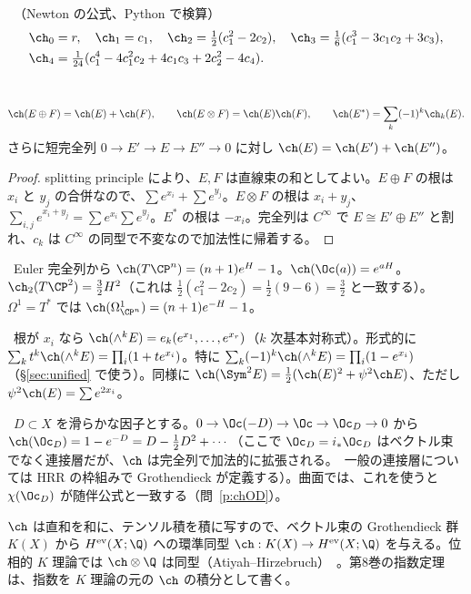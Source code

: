 \begin{thm}[低次の表]\label{thm:chlow}\tP\ （Newton の公式、Python で検算）
\begin{align*}
\ch_0&=r,\quad \ch_1=c_1,\quad \ch_2=\tfrac12(c_1^2-2c_2),\quad \ch_3=\tfrac16(c_1^3-3c_1c_2+3c_3),\\
\ch_4&=\tfrac1{24}(c_1^4-4c_1^2c_2+4c_1c_3+2c_2^2-4c_4).
\end{align*}
\end{thm}
\begin{thm}\label{thm:chmult}\tP\
\[
\ch(E\oplus F)=\ch(E)+\ch(F),\qquad \ch(E\otimes F)=\ch(E)\ch(F),\qquad \ch(E^*)=\sum_k(-1)^k\ch_k(E).
\]
さらに短完全列 $0\to E'\to E\to E''\to0$ に対し $\ch(E)=\ch(E')+\ch(E'')$。
\end{thm}
\begin{proof}
splitting principle により、$E,F$ は直線束の和としてよい。$E\oplus F$ の根は $x_i$ と $y_j$ の合併なので、$\sum e^{x_i}+\sum e^{y_j}$。$E\otimes F$ の根は $x_i+y_j$、$\sum_{i,j}e^{x_i+y_j}=\sum e^{x_i}\sum e^{y_j}$。$E^*$ の根は $-x_i$。完全列は $C^\infty$ で $E\cong E'\oplus E''$ と割れ、$c_k$ は $C^\infty$ の同型で不変なので加法性に帰着する。
\end{proof}
\begin{ex}[$\CP^n$ 上の計算]\label{ex:chPn}\tP\
Euler 完全列から $\ch(T\CP^n)=(n+1)e^H-1$。$\ch(\Oc(a))=e^{aH}$。$\ch_2(T\CP^2)=\frac32H^2$（これは $\frac12(c_1^2-2c_2)=\frac12(9-6)=\frac32$ と一致する）。$\Omega^1=T^*$ では $\ch(\Omega^1_{\CP^n})=(n+1)e^{-H}-1$。
\end{ex}
\begin{ex}[$\wedge^kE$ と $\Sym^kE$]\label{ex:chwedge}\tP\
根が $x_i$ なら $\ch(\wedge^kE)=e_k(e^{x_1},\dots,e^{x_r})$（$k$ 次基本対称式）。形式的に $\sum_kt^k\ch(\wedge^kE)=\prod_i(1+te^{x_i})$。特に $\sum_k(-1)^k\ch(\wedge^kE)=\prod_i(1-e^{x_i})$（\S\ref{sec:unified} で使う）。同様に $\ch(\Sym^2E)=\frac12(\ch(E)^2+\psi^2\ch E)$、ただし $\psi^2\ch(E)=\sum e^{2x_i}$。
\end{ex}
\begin{ex}[因子の構造層]\label{ex:chOD}\tP\
$D\subset X$ を滑らかな因子とする。$0\to\Oc(-D)\to\Oc\to\Oc_D\to0$ から $\ch(\Oc_D)=1-e^{-D}=D-\tfrac12D^2+\cdots$（ここで $\Oc_D=i_*\Oc_D$ はベクトル束でなく連接層だが、$\ch$ は完全列で加法的に拡張される。\tC\ 一般の連接層については HRR の枠組みで Grothendieck が定義する）。曲面では、これを使うと $\chi(\Oc_D)$ が随伴公式と一致する（問~\ref{p:chOD}）。
\end{ex}
\begin{rem}[$K$ 理論との関係]
$\ch$ は直和を和に、テンソル積を積に写すので、ベクトル束の Grothendieck 群 $K(X)$ から $H^{\rm ev}(X;\Q)$ への環準同型 $\ch:K(X)\to H^{\rm ev}(X;\Q)$ を与える。位相的 $K$ 理論では $\ch\otimes\Q$ は同型（Atiyah--Hirzebruch）\tC\ 。第8巻の指数定理は、指数を $K$ 理論の元の $\ch$ の積分として書く。
\end{rem}

